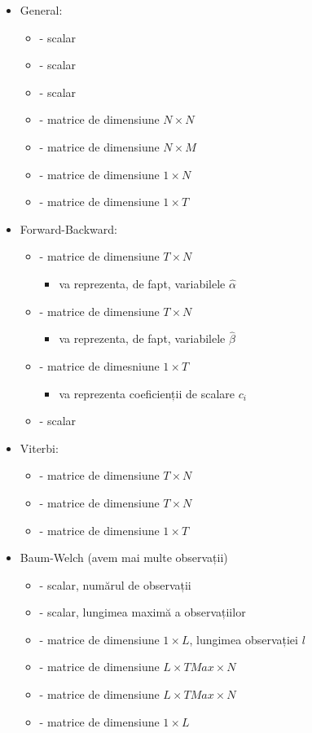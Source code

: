 \documentclass[12pt]{article}
\begin{document}
\begin{itemize}
\item General:
  \begin{itemize}
  \item {} - scalar
  \item {} - scalar
  \item {} - scalar
  \item {} - matrice de dimensiune $N \times N$
  \item {} - matrice de dimensiune $N \times M$
  \item {} - matrice de dimensiune $1 \times N$
  \item {} - matrice de dimensiune $1 \times T$
  \end{itemize}
\item Forward-Backward:
  \begin{itemize}
  \item {} - matrice de dimensiune $T \times N$
    \begin{itemize}
    \item va reprezenta, de fapt, variabilele $\hat{\alpha}$
    \end{itemize}
  \item {} - matrice de dimensiune $T \times N$
    \begin{itemize}
    \item va reprezenta, de fapt, variabilele $\hat{\beta}$
    \end{itemize}
  \item {} - matrice de dimesniune $1 \times T$
    \begin{itemize}
    \item va reprezenta coeficienții de scalare $c_i$
    \end{itemize}
  \item {} - scalar
  \end{itemize}
\item Viterbi:
  \begin{itemize}
  \item {} - matrice de dimensiune $T \times N$
  \item {} - matrice de dimensiune $T \times N$
  \item {} - matrice de dimensiune $1 \times T$
  \end{itemize}
\item Baum-Welch (avem mai multe observații)
  \begin{itemize}
  \item {} - scalar, numărul de observații
  \item {} - scalar, lungimea maximă a observațiilor
  \item {} - matrice de dimensiune $1 \times L$, lungimea
    observației $l$
  \item {} - matrice de dimensiune $L \times TMax \times N$
  \item {} - matrice de dimensiune $L \times TMax \times N$
  \item {} - matrice de dimensiune $1 \times L$
  \end{itemize}
\end{itemize}
\end{document}
